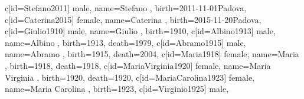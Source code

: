 \documentclass{article}
\begin{document}
\begin{midpage}
\begin{center}
\begin{genealogypicture}
{{{{{{{{{{{{                                            }
                                            c[id=Stefano2011]{
                                                male,
                                                name={Stefano },
                                                birth={2011-11-01}{Padova},
                                            }
                                            c[id=Caterina2015]{
                                                female,
                                                name={Caterina },
                                                birth={2015-11-20}{Padova},
                                            }
                                        }
                                    }
                                }
                                c[id=Giulio1910]{
                                    male,
                                    name={Giulio },
                                    birth={1910}{},
                                }
                                c[id=Albino1913]{
                                    male,
                                    name={Albino },
                                    birth={1913}{},
                                    death={1979}{},
                                }
                                c[id=Abramo1915]{
                                    male,
                                    name={Abramo },
                                    birth={1915}{},
                                    death={2004}{},
                                }
                                c[id=Maria1918]{
                                    female,
                                    name={Maria },
                                    birth={1918}{},
                                    death={1918}{},
                                }
                                c[id=MariaVirginia1920]{
                                    female,
                                    name={Maria Virginia },
                                    birth={1920}{},
                                    death={1920}{},
                                }
                                c[id=MariaCarolina1923]{
                                    female,
                                    name={Maria Carolina },
                                    birth={1923}{},
                                }
                                c[id=Virginio1925]{
                                    male,
}}}}}}}}}
\end{genealogypicture}
\end{center}
\end{midpage}
\end{document}
